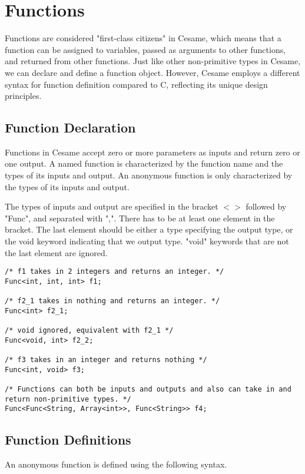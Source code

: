 \documentclass[11pt,A4]{article}
\begin{document}
    \newpage
    \section{Functions}
        Functions are considered "first-class citizens" in Cesame, which means that a function can be assigned to variables, passed as arguments to other functions, and returned from other functions. Just like other non-primitive types in Cesame, we can declare and define a function object. However, Cesame employs a different syntax for function definition compared to C, reflecting its unique design principles.

        \subsection{Function Declaration}
            Functions in Cesame accept zero or more parameters as inputs and return zero or one output. A named function is characterized by the function name and the types of its inputs and output. An anonymous function is only characterized by the types of its inputs and output.


The types of inputs and output are specified in the bracket $<>$ followed by "Func", and separated with ",". There has to be at least one element in the bracket. The last element should be either a type specifying the output type, or the void keyword indicating that we output type. "void" keywords that are not the last element are ignored.

        \begin{lstlisting}
/* f1 takes in 2 integers and returns an integer. */
Func<int, int, int> f1;

/* f2_1 takes in nothing and returns an integer. */
Func<int> f2_1; 

/* void ignored, equivalent with f2_1 */
Func<void, int> f2_2;

/* f3 takes in an integer and returns nothing */
Func<int, void> f3; 

/* Functions can both be inputs and outputs and also can take in and return non-primitive types. */
Func<Func<String, Array<int>>, Func<String>> f4;
        \end{lstlisting}
        
        \subsection{Function Definitions}

An anonymous function is defined using the following syntax.
\end{document}
